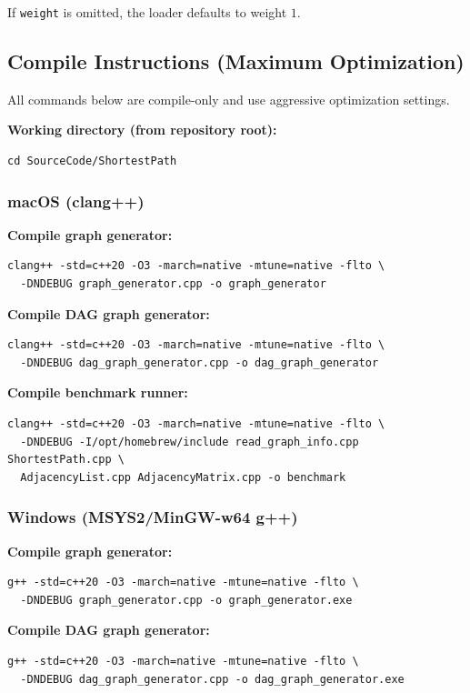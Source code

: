 If \texttt{weight} is omitted, the loader defaults to weight $1$.

\subsection{Compile Instructions (Maximum Optimization)}
All commands below are compile-only and use aggressive optimization settings.

\textbf{Working directory (from repository root):}
\begin{verbatim}
cd SourceCode/ShortestPath
\end{verbatim}

\subsubsection{macOS (clang++)}
\textbf{Compile graph generator:}
\begin{verbatim}
clang++ -std=c++20 -O3 -march=native -mtune=native -flto \
  -DNDEBUG graph_generator.cpp -o graph_generator
\end{verbatim}

\textbf{Compile DAG graph generator:}
\begin{verbatim}
clang++ -std=c++20 -O3 -march=native -mtune=native -flto \
  -DNDEBUG dag_graph_generator.cpp -o dag_graph_generator
\end{verbatim}

\textbf{Compile benchmark runner:}
\begin{verbatim}
clang++ -std=c++20 -O3 -march=native -mtune=native -flto \
  -DNDEBUG -I/opt/homebrew/include read_graph_info.cpp ShortestPath.cpp \
  AdjacencyList.cpp AdjacencyMatrix.cpp -o benchmark
\end{verbatim}

\subsubsection{Windows (MSYS2/MinGW-w64 g++)}
\textbf{Compile graph generator:}
\begin{verbatim}
g++ -std=c++20 -O3 -march=native -mtune=native -flto \
  -DNDEBUG graph_generator.cpp -o graph_generator.exe
\end{verbatim}

\textbf{Compile DAG graph generator:}
\begin{verbatim}
g++ -std=c++20 -O3 -march=native -mtune=native -flto \
  -DNDEBUG dag_graph_generator.cpp -o dag_graph_generator.exe
\end{verbatim}

